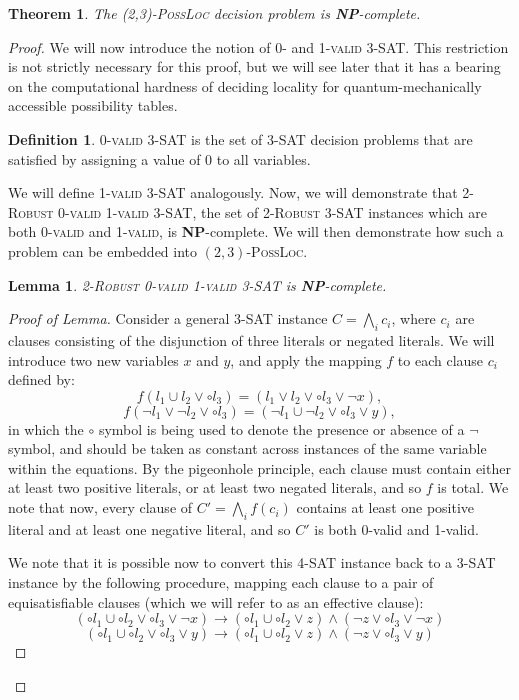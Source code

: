 \documentclass[reprint]{revtex4-1}
\newtheorem{thm}{Theorem}
\newtheorem{lem}{Lemma}
\theoremstyle{definition}
\newtheorem{defn}{Definition}
\begin{document}
\begin{thm}
The \textsc{(2,3)-PossLoc} decision problem is \textbf{NP}-complete.
\end{thm}
\begin{proof}
We will now introduce the notion of 0- and \textsc{1-valid 3-SAT}. This restriction is not strictly necessary for  this proof, but we will see later that it has a bearing on the computational hardness of deciding locality for quantum-mechanically accessible possibility tables.
\begin{defn}
\textsc{0-valid 3-SAT} is the set of \textsc{3-SAT} decision problems that are satisfied by assigning a value of 0 to all variables.
\end{defn}
We will define \textsc{1-valid 3-SAT} analogously. Now, we will demonstrate that \textsc{2-Robust 0-valid 1-valid 3-SAT}, the set of \textsc{2-Robust 3-SAT} instances which are both \textsc{0-valid} and \textsc{1-valid}, is \textbf{NP}-complete. We will then demonstrate how such a problem can be embedded into $(2,3)$-\textsc{PossLoc}.
\begin{lem}\label{rob3sat}
\textsc{2-Robust 0-valid 1-valid 3-SAT} is \textbf{NP}-complete.
\end{lem}
\begin{proof}[Proof of Lemma]
Consider a general \textsc{3-SAT} instance $C=\bigwedge_i c_i$, where $c_i$ are clauses consisting of the disjunction of three literals or negated literals. We will introduce two new variables $x$ and $y$, and apply the mapping $f$ to each clause $c_i$ defined by:
\begin{equation}
f(l_1\cup l_2 \vee  \circ  l_3) = (l_1\vee l_2 \vee \circ l_3 \vee \neg x),
\end{equation}
\begin{equation}
f(\neg l_1\vee\neg l_2 \vee \circ  l_3) = (\neg l_1\cup\neg l_2 \vee \circ  l_3 \vee  y),
\end{equation}
in which the $\circ$ symbol is being used to denote the presence or absence of a $\neg$ symbol, and should be taken as constant across instances of the same variable within the equations. By the pigeonhole principle, each clause must contain either at least two positive literals, or at least two negated literals, and so $f$ is total. We note that now, every clause of $C'=\bigwedge_i f(c_i)$ contains at least one positive literal and at least one negative literal, and so $C'$ is both 0-valid and 1-valid.

We note that it is possible now to convert this 4-SAT instance back to a \textsc{3-SAT} instance by the following procedure, mapping each clause to a pair of equisatisfiable clauses (which we will refer to as an effective clause):
\begin{equation}
(\circ l_1\cup\circ l_2 \vee  \circ  l_3 \vee \neg x) \rightarrow (\circ l_1\cup\circ l_2 \vee z)\wedge(\neg z \vee \circ  l_3 \vee\neg x)
\end{equation}
\begin{equation}
(\circ l_1\cup\circ l_2 \vee  \circ  l_3 \vee y) \rightarrow (\circ l_1\cup\circ l_2 \vee z)\wedge(\neg z \vee \circ  l_3 \vee y)
\end{equation}


\end{proof}
\end{proof}
\end{document}
